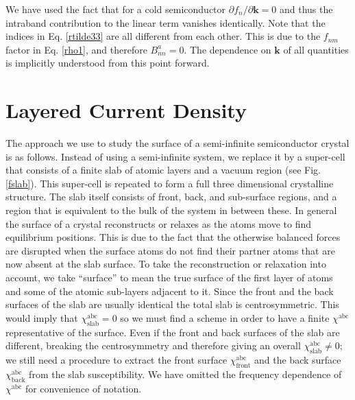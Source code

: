We have used the fact that for a cold semiconductor $\partial f_{n}/\partial
\mathbf{k}=0$ and thus the intraband contribution to the linear term vanishes
identically. Note that the indices in Eq. \eqref{rtilde33} are all different
from each other. This is due to the $f_{nm}$ factor in Eq. \eqref{rho1}, and
therefore $B^a_{nn}=0$. The dependence on $\mathbf{k}$ of all quantities is
implicitly understood from this point forward.


\section{Layered Current Density}\label{cd}

The approach we use to study the surface of a semi-infinite semiconductor
crystal is as follows. Instead of using a semi-infinite system, we replace it by
a super-cell that consists of a finite slab of atomic layers and a vacuum region
(see Fig. \ref{fslab}). This super-cell is repeated to form a full three
dimensional crystalline structure. The slab itself consists of front, back, and
sub-surface regions, and a region that is equivalent to the bulk of the system
in between these. In general the surface of a crystal reconstructs or relaxes as
the atoms move to find equilibrium positions. This is due to the fact that the
otherwise balanced forces are disrupted when the surface atoms do not find their
partner atoms that are now absent at the slab surface. To take the
reconstruction or relaxation into account, we take ``surface'' to mean the true
surface of the first layer of atoms and some of the atomic sub-layers adjacent
to it. Since the front and the back surfaces of the slab are usually identical
the total slab is centrosymmetric. This would imply that
$\chi^{\mathrm{abc}}_{\mathrm{slab}}=0$ so we must find a scheme in order to
have a finite $\chi^{\mathrm{abc}}$ representative of the surface. Even if the
front and back surfaces of the slab are different, breaking the centrosymmetry
and therefore giving an overall $\chi^{\mathrm{abc}}_{\mathrm{slab}}\ne 0$; we
still need a procedure to extract the front surface
$\chi^{\mathrm{abc}}_{\mathrm{front}}$ and the back surface
$\chi^{\mathrm{abc}}_{\mathrm{back}}$ from the slab susceptibility. We have
omitted the frequency dependence of $\chi^{\mathrm{abc}}$ for convenience of
notation.

